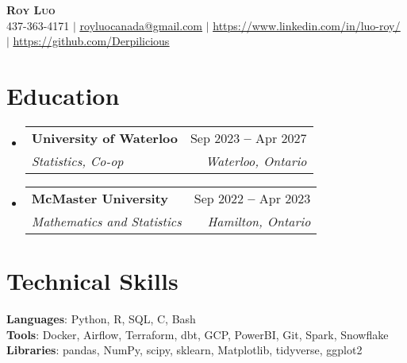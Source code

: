 \documentclass[letterpaper,11pt]{article}
\makeatletter
\newcommand{\resumeSubheading}[4]{
  \vspace{-2pt}\item
    \begin{tabular*}{0.97\textwidth}[t]{l@{\extracolsep{\fill}}r}
      \textbf{#1} & #2 \\
      \textit{\small#3} & \textit{\small #4} \\
    \end{tabular*}\vspace{-7pt}
}
\newcommand{\resumeSubHeadingListStart}{\begin{itemize}[leftmargin=0.15in, label={}]}
\newcommand{\resumeSubHeadingListEnd}{\end{itemize}}
\makeatother
\begin{document}

\begin{center}
    \textbf{\Huge \scshape Roy Luo} \\ \vspace{1pt}
    \small 437-363-4171 $|$ \href{mailto:royluocanada@gmail.com}{\underline{royluocanada@gmail.com}} $|$ 
    \href{https://linkedin.com/in/luo-roy/}{\underline{https://www.linkedin.com/in/luo-roy/}} $|$
    \href{https://github.com/Derpilicious}{\underline{https://github.com/Derpilicious}}
\end{center}
 
\section{Education}
  \resumeSubHeadingListStart
    \resumeSubheading
      {University of Waterloo}{Sep 2023 \textbf{--} Apr 2027}
      {Statistics, Co-op}{Waterloo, Ontario}
    \resumeSubheading
      {McMaster University}{Sep 2022 \textbf{--} Apr 2023}
      {Mathematics and Statistics}{Hamilton, Ontario}
\resumeSubHeadingListEnd
      
\section{Technical Skills}
\begin{itemize}[leftmargin=0.15in, label={}]
   \small{\item{
    \textbf{Languages}{: Python, R, SQL, C, Bash} \\
    \textbf{Tools}{: Docker, Airflow, Terraform, dbt, GCP, PowerBI, Git, Spark, Snowflake} \\
    \textbf{Libraries}{: pandas, NumPy, scipy, sklearn, Matplotlib, tidyverse, ggplot2} \\
   }}
 \end{itemize}
\end{document}
